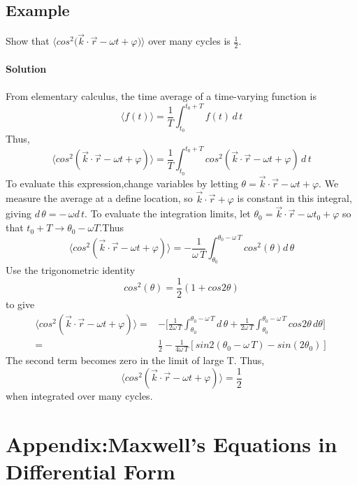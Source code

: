 \documentclass[12pt]{article}
\numberwithin{equation}{section}
\begin{document}
\subsection{Example}
Show that $\bigg\langle cos^2\bigg(\vec{k}\cdot\vec{r}-\omega t+\varphi\bigg)\bigg\rangle$ over many cycles is $\frac{1}{2}$.
\\
\\
\textbf{Solution}
\\
\\
From elementary calculus, the time average of a time-varying function is 
\[
    \langle f(t)\rangle=\frac{1}{T}\int_{t_0}^{t_0+T}f(t)\,d\,t
\]
Thus,
\[
   \langle cos^2(\vec{k}\cdot\vec{r}-\omega t+\varphi)\rangle=\frac{1}{T}\int_{t_0}^{t_0+T}cos^2(\vec{k}\cdot\vec{r}-\omega t+\varphi)\,d\,t
\]
To evaluate this expression,change variables by letting $\theta=\vec{k}\cdot\vec{r}-\omega t+\varphi$. We measure the average at a define location, so $\vec{k}\cdot\vec{r}+\varphi$ is constant in this integral, giving $d\,\theta=-\,\omega d\,t$.
To evaluate the integration limits, let $\theta_0=\vec{k}\cdot\vec{r}-\omega t_0+\varphi$ so that $t_0+T\to \theta_0-\omega T$.Thus
\[
    \langle cos^2(\vec{k}\cdot\vec{r}-\omega t+\varphi)\rangle=-\frac{1}{\omega\,T}\int_{\theta_0}^{\theta_0-\omega\,T}cos^2(\theta)d\,\theta
\]
Use the trigonometric identity
\[
    cos^2(\theta)=\frac{1}{2}(1+cos2\theta)
\]
to give
\[
\begin{split}
    \langle cos^2(\vec{k}\cdot\vec{r}-\omega t+\varphi)\rangle=&-\biggl[\frac{1}{2\omega\,T}\int_{\theta_0}^{\theta_0-\omega\,T}d\,\theta+\frac{1}{2\omega\,T}\int_{\theta_0}^{\theta_0-\omega\,T}cos2\theta\,d\theta\biggl]
    \\
    =&\frac{1}{2}-\frac{1}{4\omega\,T}[sin2(\theta_0-\omega\,T)-sin(2\theta_0)]
\end{split}
\]
The second term becomes zero in the limit of large T. Thus,
\[
    \langle cos^2(\vec{k}\cdot\vec{r}-\omega t+\varphi)\rangle=\frac{1}{2}
\]
when integrated over many cycles.


\newpage
\appendix
\section{Appendix:Maxwell's Equations in Differential Form}
\end{document}
